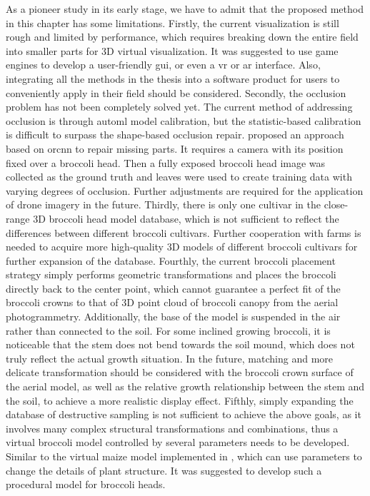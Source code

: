 As a pioneer study in its early stage, we have to admit that the proposed method in this chapter has some limitations. 
Firstly, the current visualization is still rough and limited by performance, which requires breaking down the entire field into smaller parts for 3D virtual visualization. It was suggested to use game engines to develop a user-friendly \gls{gui}, or even a \gls{vr} or \gls{ar} interface. Also, integrating all the methods in the thesis into a software product for users to conveniently apply in their field should be considered. 
Secondly, the occlusion problem has not been completely solved yet. The current method of addressing occlusion is through \gls{automl} model calibration, but the statistic-based calibration is difficult to surpass the shape-based occlusion repair. \citet{blok_image_2021} proposed an approach based on \gls{orcnn} to repair missing parts. It requires a camera with its position fixed over a broccoli head. Then a fully exposed broccoli head image was collected as the ground truth and leaves were used to create training data with varying degrees of occlusion. Further adjustments are required for the application of drone imagery in the future. 
Thirdly, there is only one cultivar in the close-range 3D broccoli head model database, which is not sufficient to reflect the differences between different broccoli cultivars. Further cooperation with farms is needed to acquire more high-quality 3D models of different broccoli cultivars for further expansion of the database. 
Fourthly, the current broccoli placement strategy simply performs geometric transformations and places the broccoli directly back to the center point, which cannot guarantee a perfect fit of the broccoli crowns to that of 3D point cloud of broccoli canopy from the aerial photogrammetry. Additionally, the base of the model is suspended in the air rather than connected to the soil. For some inclined growing broccoli, it is noticeable that the stem does not bend towards the soil mound, which does not truly reflect the actual growth situation. In the future, matching and more delicate transformation should be considered with the broccoli crown surface of the aerial model, as well as the relative growth relationship between the stem and the soil, to achieve a more realistic display effect.
Fifthly, simply expanding the database of destructive sampling is not sufficient to achieve the above goals, as it involves many complex structural transformations and combinations, thus a  virtual broccoli model controlled by several parameters needs to be developed. Similar to the virtual maize model implemented in \citet{cieslak_l-system_2021}, which can use parameters to change the details of plant structure. It was suggested to develop such a procedural model for broccoli heads. 

